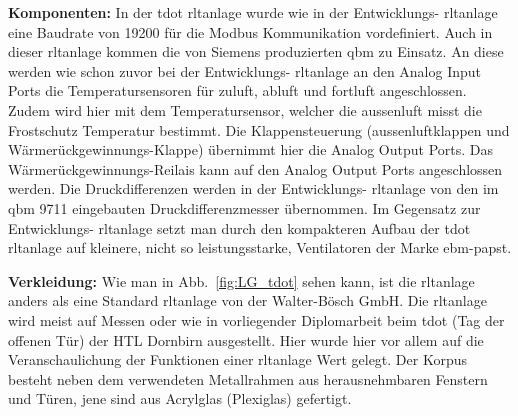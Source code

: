 \textbf{Komponenten:}
In der \gls{tdot} \ac{rltanlage} wurde wie in der Entwicklungs- \ac{rltanlage} eine Baudrate von 19200 für die Modbus Kommunikation vordefiniert. Auch in dieser \ac{rltanlage} kommen die von Siemens produzierten \gls{qbm} zu Einsatz. An diese werden wie schon zuvor bei der Entwicklungs- \ac{rltanlage} an den Analog Input Ports die Temperatursensoren für \gls{zuluft}, \gls{abluft} und \gls{fortluft} angeschlossen. Zudem wird hier mit dem Temperatursensor, welcher die \gls{aussenluft} misst die Frostschutz Temperatur bestimmt. Die Klappensteuerung (\gls{aussenluft}klappen und Wärmerückgewinnungs-Klappe) übernimmt hier die Analog Output Ports. Das  Wärmerückgewinnungs-Reilais kann auf den Analog Output Ports angeschlossen werden. Die Druckdifferenzen werden in der Entwicklungs- \ac{rltanlage} von den im \gls{qbm} 9711 eingebauten Druckdifferenzmesser übernommen. Im Gegensatz zur Entwicklungs- \ac{rltanlage} setzt man durch den kompakteren Aufbau der \gls{tdot} \ac{rltanlage} auf kleinere, nicht so leistungsstarke, Ventilatoren der Marke ebm-papst. 


\textbf{Verkleidung:}
Wie man in Abb.~\ref{fig:LG_tdot} sehen kann, ist die \ac{rltanlage} anders als eine Standard \ac{rltanlage} von der Walter-Bösch GmbH. Die \ac{rltanlage} wird meist auf Messen oder wie in vorliegender Diplomarbeit beim \gls{tdot} (Tag der offenen Tür) der HTL Dornbirn ausgestellt. Hier wurde hier vor allem auf die Veranschaulichung der Funktionen einer \ac{rltanlage} Wert gelegt. Der Korpus besteht neben dem verwendeten Metallrahmen aus herausnehmbaren Fenstern und Türen, jene sind aus Acrylglas (Plexiglas) gefertigt. 

\newpage
